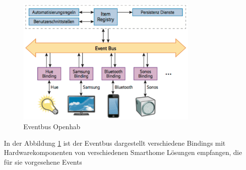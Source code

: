   \begin{figure}[H]
 	\centering
 	\includegraphics[width=0.8\textwidth]{graphics/Eventbus.PNG}
 	\caption{Eventbus Openhab \cite{noauthor_durchbruch_nodate} }	
 	\label{pic: Eventbus}
 \end{figure} 
 
 In der Abbildung \ref{pic: Eventbus} ist der Eventbus dargestellt verschiedene Bindings mit Hardwarekomponenten von verschiedenen Smarthome Lösungen empfangen, die für sie vorgesehene Events